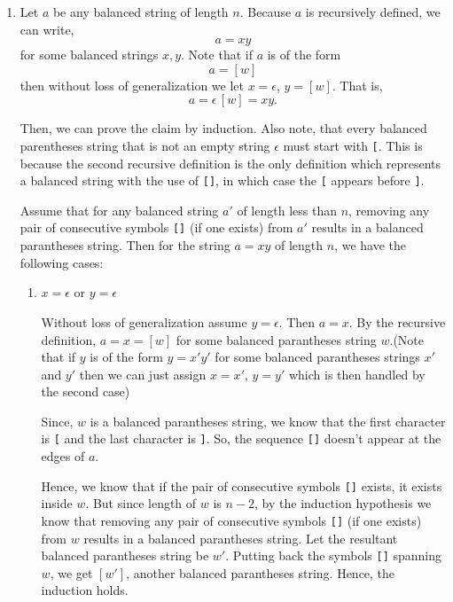 \documentclass[12pt]{article}
\begin{document}
\begin{solution}
    \bbni
    \begin{enumerate}
        \item 
        Let $a$ be any balanced string of length $n$. Because $a$ is recursively defined, we can write, 
        \[a = xy\]
        for some balanced strings $x, y$. Note that if $a$ is of the form 
        \[a =[w]\]
        then without loss of generalization we let $x = \epsilon$, $y = [w]$. That is, 
        \[a = \epsilon \, [w] = xy.\]

        Then, we can prove the claim by induction. Also note, that every balanced parentheses string that is not an empty string  $\epsilon$ must start with \texttt{[}. This is because the second recursive definition is the only definition which represents a balanced string with the use of \texttt{[]}, in which case the \texttt{[} appears before \texttt{]}.
        
        Assume that for any balanced string $a'$ of length less than $n$, removing any pair of consecutive symbols \texttt{[]} (if one exists) from $a'$ results in a balanced parantheses string. Then for the string $a = xy$ of length $n$, we have the following cases: 
        \begin{enumerate}
            \item $x = \epsilon$ or $y = \epsilon$
            
            Without loss of generalization assume $y = \epsilon$. Then $a = x$. By the recursive definition, $a = x = [w]$ for some balanced parantheses string $w$.(Note that if $y$ is of the form $ y = x'y'$ for some balanced parantheses strings $x'$ and $y'$ then we can just assign $x = x', \, y = y'$ which is then handled by the second case) 
            
            Since, $w$ is a balanced parantheses string, we know that the first character is \texttt{[} and the last character is \texttt{]}. So, the sequence \texttt{[]} doesn't appear at the edges of $a$. 

            Hence, we know that if the pair of consecutive symbols \texttt{[]} exists, it exists inside $w$. But since length of $w$ is $n-2$, by the induction hypothesis we know that removing any pair of consecutive symbols \texttt{[]} (if one exists) from $w$ results in a balanced parantheses string. Let the resultant balanced parantheses string be $w'$. Putting back the symbols \texttt{[]} spanning $w$, we get $[w']$, another balanced parantheses string. Hence, the induction holds. 


\end{enumerate}
\end{enumerate}
\end{solution}
\end{document}
